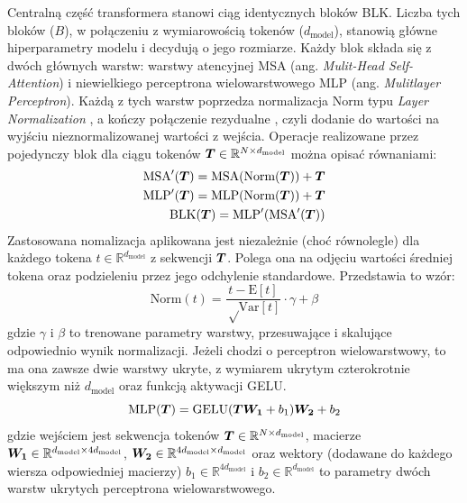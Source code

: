 Centralną część transformera stanowi ciąg identycznych bloków BLK. Liczba tych bloków ($B$), w
połączeniu z wymiarowością tokenów ($d_{\mathrm{model}}$), stanowią główne hiperparametry modelu i
decydują o jego rozmiarze. Każdy blok składa się z dwóch głównych warstw: warstwy atencyjnej MSA
(ang. \emph{Mulit-Head Self-Attention}) i niewielkiego perceptrona wielowarstwowego MLP (ang.
\emph{Mulitlayer Perceptron}). Każdą z tych warstw poprzedza normalizacja Norm typu \emph{Layer
Normalization} \cite{ba_layer_2016}, a kończy połączenie rezydualne \cite{he_deep_2015}, czyli
dodanie do wartości na wyjściu nieznormalizowanej wartości z wejścia. Operacje realizowane przez
pojedynczy blok dla ciągu tokenów $\boldsymbol{T} \in \mathbb{R}^{N \times d_{\mathrm{model}}}$ można opisać równaniami:
\begin{eqnarray}
     \textrm{MSA}'(\boldsymbol{T}) = \textrm{MSA}(\textrm{Norm}(\boldsymbol{T})) + \boldsymbol{T} \\
     \textrm{MLP}'(\boldsymbol{T}) = \textrm{MLP}(\textrm{Norm}(\boldsymbol{T})) + \boldsymbol{T} \\
     \textrm{BLK}(\boldsymbol{T}) = \textrm{MLP}'(\textrm{MSA}'(\boldsymbol{T}))
\end{eqnarray}
Zastosowana nomalizacja aplikowana jest niezależnie (choć równolegle) dla każdego tokena $t \in
\mathbb{R}^{d_{\mathrm{model}}}$ z sekwencji $\boldsymbol{T}$. Polega ona na odjęciu wartości średniej
tokena oraz podzieleniu przez jego odchylenie standardowe. Przedstawia to wzór:
\begin{equation}
    \textrm{Norm}(t) = \frac{t - \textrm{E}[t]}{\sqrt \textrm{Var}[t]} \cdot \gamma + \beta
\end{equation}
gdzie $\gamma$ i $\beta$ to trenowane parametry warstwy, przesuwające i skalujące odpowiednio wynik
normalizacji. Jeżeli chodzi o perceptron wielowarstwowy, to ma ona zawsze dwie warstwy ukryte, z
wymiarem ukrytym czterokrotnie większym niż $d_{\mathrm{model}}$ oraz funkcją aktywacji GELU.
\begin{equation}
    \textrm{MLP}(\boldsymbol{T}) = \textrm{GELU}(\boldsymbol{T}\boldsymbol{W_1} + b_1)\boldsymbol{W_2} + b_2
\end{equation}
gdzie wejściem jest sekwencja tokenów $\boldsymbol{T} \in \mathbb{R}^{N \times d_{\mathrm{model}}}$, macierze
$\boldsymbol{W_1} \in \mathbb{R}^{d_{\mathrm{model}} \times 4d_{\mathrm{model}}}$,
$\boldsymbol{W_2} \in \mathbb{R}^{4d_{\mathrm{model}} \times d_{\mathrm{model}}}$ oraz wektory (dodawane do każdego wiersza
odpowiedniej macierzy) $b_1 \in \mathbb{R}^{4d_{\mathrm{model}}}$ i $b_2 \in
\mathbb{R}^{d_{\mathrm{model}}}$ to parametry dwóch warstw ukrytych perceptrona wielowarstwowego.

